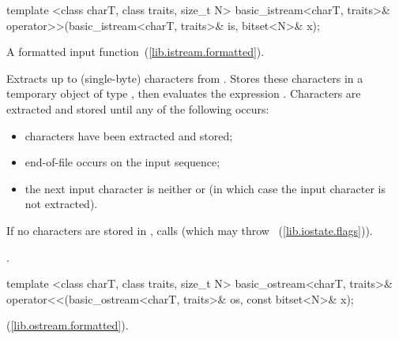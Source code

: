 %
\begin{itemdecl}
template <class charT, class traits, size_t N>
  basic_istream<charT, traits>&
  operator>>(basic_istream<charT, traits>& is, bitset<N>& x);
\end{itemdecl}

\begin{itemdescr}
\pnum
A formatted input function~(\ref{lib.istream.formatted}).

\pnum
\effects
Extracts up to  (single-byte) characters from .
Stores these characters in a temporary object  of type
,
then evaluates the expression
.
Characters are extracted and stored until any of the following occurs:

\begin{itemize}
\item
{} characters have been extracted and stored;
\item
end-of-file occurs on the input sequence;%
\item
the next input character is neither
or
(in which case the input character is not extracted).
\end{itemize}

\pnum
If no characters are stored in , calls
(which may throw
~(\ref{lib.iostate.flags})).

\pnum
\returns
{}.
\end{itemdescr}

%
\begin{itemdecl}
template <class charT, class traits, size_t N>
  basic_ostream<charT, traits>&
  operator<<(basic_ostream<charT, traits>& os, const bitset<N>& x);
\end{itemdecl}

\begin{itemdescr}
\pnum
\returns
{}
(\ref{lib.ostream.formatted}).
\end{itemdescr}
